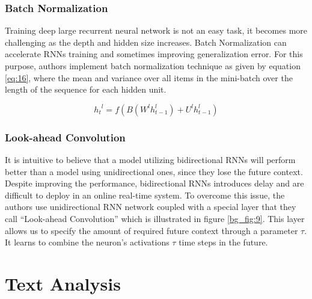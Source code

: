 \subsubsection{Batch Normalization}
\label{bg:s3_sub3_subsub2}

Training deep large recurrent neural network is not an easy task, it becomes more challenging as the depth and hidden size increases. Batch Normalization \cite{ioffe2015batch} can accelerate \ac{RNN}s training and sometimes improving generalization error. For this purpose, authors implement batch normalization technique as given by equation \ref{eq:16}, where the mean and variance over all items in the mini-batch over the length
of the sequence for each hidden unit.

\begin{equation}
\label{eq:16}
	{h_t}^l = f(B(W^l h^l_{t-1}) + U^l h^l_{t-1}) 
\end{equation}


\subsubsection{Look-ahead Convolution}
\label{bg:s3_sub3_subsub3}

It is intuitive to believe that a model utilizing bidirectional \ac{RNN}s will perform better than a model using unidirectional ones, since they lose the future context. Despite improving the performance, bidirectional \ac{RNN}s introduces delay and are difficult to deploy in an online real-time system.
To overcome this issue, the authors use unidirectional \ac{RNN} network coupled with a special layer that they call \enquote{Look-ahead Convolution} which is illustrated in figure \ref{bg_fig:9}. This layer allows us to specify the amount of required future context through a parameter $\tau$. It learns to combine the neuron's activations $\tau$ time steps in the future.




















\section{Text Analysis} 
\label{bg:s4}

